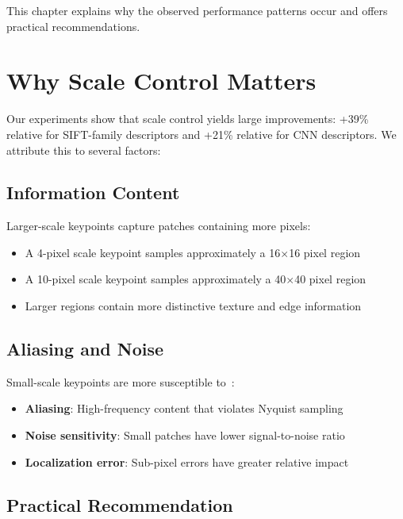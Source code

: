 
This chapter explains why the observed performance patterns occur and offers practical recommendations.

\section{Why Scale Control Matters}

Our experiments show that scale control yields large improvements: +39\% relative for SIFT-family descriptors and +21\% relative for CNN descriptors. We attribute this to several factors:

\subsection{Information Content}

Larger-scale keypoints capture patches containing more pixels:
\begin{itemize}
    \item A 4-pixel scale keypoint samples approximately a 16$\times$16 pixel region
    \item A 10-pixel scale keypoint samples approximately a 40$\times$40 pixel region
    \item Larger regions contain more distinctive texture and edge information
\end{itemize}

\subsection{Aliasing and Noise}

Small-scale keypoints are more susceptible to~\cite{lowe2004distinctive}:
\begin{itemize}
    \item \textbf{Aliasing}: High-frequency content that violates Nyquist sampling
    \item \textbf{Noise sensitivity}: Small patches have lower signal-to-noise ratio
    \item \textbf{Localization error}: Sub-pixel errors have greater relative impact
\end{itemize}

\subsection{Practical Recommendation}

